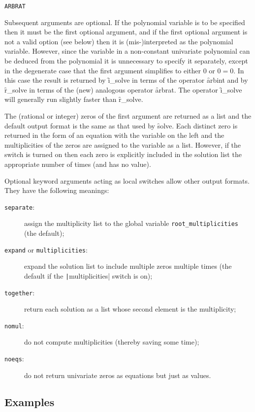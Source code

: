 \hypertarget{operator:ARBRAT}{\texttt{ARBRAT}}
Subsequent arguments are optional.  If the polynomial variable is to
be specified then it must be the first optional argument, and if the
first optional argument is not a valid option (see below) then it is
(mis-)interpreted as the polynomial variable.  However, since the
variable in a non-constant univariate polynomial can be deduced from
the polynomial it is unnecessary to specify it separately, except in
the degenerate case that the first argument simplifies to either 0 or
$0 = 0$.  In this case the result is returned by \f{i\_solve} in
terms of the operator \f{arbint} and by \f{r\_solve} in terms of
the (new) analogous operator \f{arbrat}.  The operator
\f{i\_solve} will generally run slightly faster than \f{r\_solve}.
  
The (rational or integer) zeros of the first argument are returned as
a list and the default output format is the same as that used by
\f{solve}.  Each distinct zero is returned in the form of an
equation with the variable on the left and the multiplicities of the
zeros are assigned to the variable  as a
list.  However, if the switch  is turned on then
each zero is explicitly included in the solution list the appropriate
number of times (and  has no value).
  
\begin{sloppypar}
Optional keyword arguments acting as local switches allow other output
formats.  They have the following meanings:
\begin{description}
\item[\texttt{separate}:] assign the multiplicity list to the global
  variable \texttt{root\_multiplicities} (the default);
\item[\texttt{expand} or \texttt{multiplicities}:] expand the solution
  list to include multiple zeros multiple times (the default if the
  \texttt|multiplicities| switch is on);
\item[\texttt{together}:] return each solution as a list whose second
  element is the multiplicity;
\item[\texttt{nomul}:] do not compute multiplicities (thereby saving
  some time);
\item[\texttt{noeqs}:] do not return univariate zeros as equations but
  just as values.
\end{description}
\end{sloppypar}


\subsection{Examples}

